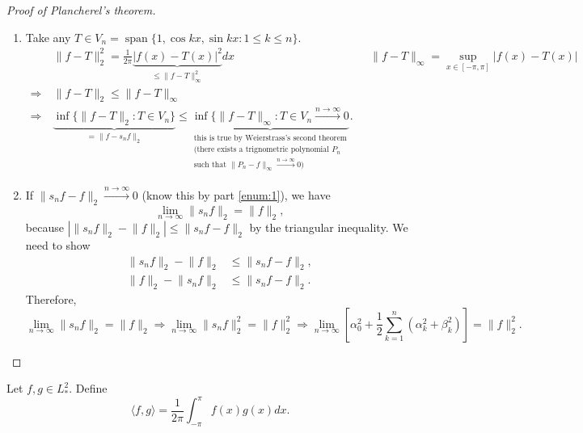 \documentclass[letterpaper, reqno,11pt]{article}
\DeclareMathOperator{\Span}{span}
\begin{document}
\begin{proof}[Proof of Plancherel's theorem]
  \begin{enumerate}
  \item \label{enum:1} Take any $T \in V_n = \Span\{ 1, \cos kx, \sin kx : 1 \leq k \leq n \}$.
    \begin{align*}
      & \lVert f - T \rVert_2^2 = \frac{1}{2\pi} \underbrace{|f(x) - T(x)|^2}_{\leq \lVert f - T \rVert_\infty^2} dx && \lVert f - T \rVert_\infty = \sup_{x \in [-\pi, \pi]} |f(x) - T(x)| \\
      \Rightarrow ~ & \lVert f - T \rVert_2 \leq \lVert f - T \rVert_\infty \\
      \Rightarrow ~ & \underbrace{\inf \{ \lVert f - T \rVert_2 : T \in V_n \}}_{ = \lVert f - s_n f \rVert_2} \leq \underbrace{\inf \{ \lVert f - T \rVert_\infty : T \in V_n \xrightarrow{n \to \infty} 0}_{\substack{\text{this is true by Weierstrass's second theorem} \\ \text{(there exists a trignometric polynomial $P_n$} \\ \text{such that $\lVert P_n - f \rVert_\infty \xrightarrow{n \to \infty} 0$)}}}.
    \end{align*}
  \item If $\lVert s_n f - f \rVert_2 \xrightarrow{n \to \infty} 0$ (know this by part \ref{enum:1}), we have
    \[ \lim_{n \to \infty} \lVert s_n f \rVert_2 = \lVert f \rVert_2, \]
    because $| \lVert s_n f \rVert_2 - \lVert f \rVert_2| \leq \lVert s_n f - f \rVert_2$ by the triangular inequality. We need to show
    \begin{align*}
      \lVert s_n f \rVert_2 - \lVert f \rVert_2 &\leq \lVert s_n f - f \rVert_2, \\
      \lVert f \rVert_2 - \lVert s_n f \rVert_2 &\leq \lVert s_n f - f \rVert_2.
    \end{align*}
    Therefore,
    \[ \lim_{n \to \infty} \lVert s_n f \rVert_2 = \lVert f \rVert_2 \Rightarrow \lim_{n \to \infty} \lVert s_n f \rVert_2^2 = \lVert f \rVert_2^2 \Rightarrow \lim_{n \to \infty} \left[\alpha_0^2 + \frac{1}{2} \sum_{k = 1}^n \left(\alpha_k^2 + \beta_k^2\right)\right] = \lVert f \rVert_2^2. \]
  \end{enumerate}
\end{proof}


\begin{figure}[H]
  \centering
\end{figure}

\begin{defn}
  \normalfont Let $f, g \in L_*^2$. Define
  \[ \langle f, g \rangle = \frac{1}{2\pi} \int_{-\pi}^\pi f(x) g(x) dx. \]
\end{defn}
\end{document}
